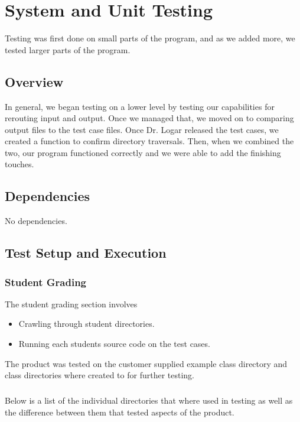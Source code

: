 
\chapter{System  and Unit Testing}

Testing was first done on small parts of the program, and as we added more, we tested larger parts of the program.

\section{Overview}
In general, we began testing on a lower level by testing our 
capabilities for rerouting input and output. Once we managed that,
we moved on to comparing output files to the test case files. Once Dr. 
Logar released the test cases, we created a function to confirm directory 
traversals. Then, when we combined the two, our program functioned correctly
and we were able to add the finishing touches.



\section{Dependencies}
No dependencies.


\section{Test Setup and Execution}
\subsection{Student Grading}
The student grading section involves
\begin{itemize}
\item Crawling through student directories.
\item Running each students source code on the test cases.
\end{itemize}
The product was tested on the customer supplied example class directory and class directories where created to for further testing.

\paragraph{} Below is a list of the individual directories that where used in testing as well as the difference between them that tested aspects of the product.

